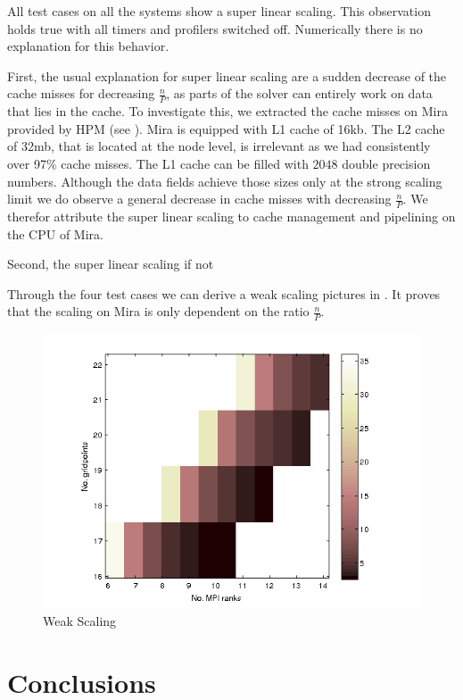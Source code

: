 \documentclass{sig-alternate}
\begin{document}
All test cases on all the systems show a super linear scaling. This
observation holds true with all timers and profilers switched off.
Numerically there is no explanation for this behavior. 

First, the usual explanation for super linear scaling are a sudden decrease of the cache
misses for decreasing $\frac{n}{P}$, as parts of the solver can entirely work on
data that lies in the cache. 
To investigate this, we extracted the cache misses on Mira provided by HPM (see
). Mira is equipped with L1 cache of 16kb. The L2 cache
of 32mb, that is located at the node level, is irrelevant as we had consistently
over 97\% cache misses. The L1 cache can be filled with $2048$ double precision
numbers. Although the data fields achieve those sizes only at the strong scaling
limit we do observe a general decrease in cache misses with decreasing
$\frac{n}{P}$. We therefor attribute the super linear scaling to cache
management and pipelining on the CPU of Mira. 

Second, the super linear scaling if not  

Through the four test cases we can derive a weak scaling pictures in
. It proves that the scaling on Mira is only dependent
on the ratio $\frac{n}{P}$. 
\begin{figure}
  \centering
  \includegraphics[width=\linewidth]{./figures/weak.png}
  \caption{Weak Scaling}
  \label{fig:weakscaling}
\end{figure}
\section{Conclusions}
\end{document}
